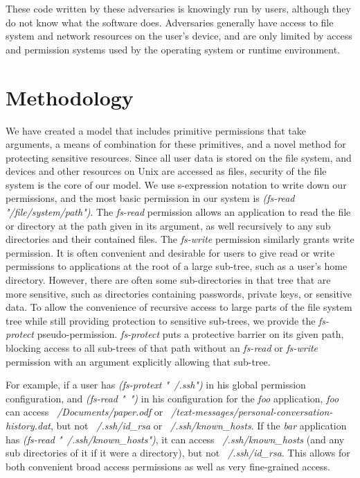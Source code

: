 These code written by these adversaries is knowingly run by users, although they do not know what the software does.  Adversaries generally have access to file system and network resources on the user's device, and are only limited by access and permission systems used by the operating system or runtime environment.

\section{Methodology}\label{section:methodology}
We have created a model that includes primitive permissions that take arguments, a means of combination for these primitives, and a novel method for protecting sensitive resources.
Since all user data is stored on the file system, and devices and other resources on Unix are accessed as files, security of the file system is the core of our model.
We use s-expression notation to write down our permissions, and the most basic permission in our system is \textit{(fs-read "/file/system/path")}.  
The \textit{fs-read} permission allows an application to read the file or directory at the path given in its argument, as well recursively to any sub directories and their contained files.
The \textit{fs-write} permission similarly grants write permission.
It is often convenient and desirable for users to give read or write permissions to applications at the root of a large sub-tree, such as a user's home directory.  
However, there are often some sub-directories in that tree that are more sensitive, such as directories containing passwords, private keys, or sensitive data.
To allow the convenience of recursive access to large parts of the file system tree while still providing protection to sensitive sub-trees, we provide the \textit{fs-protect} pseudo-permission.
\textit{fs-protect} puts a protective barrier on its given path, blocking access to all sub-trees of that path without an \textit{fs-read} or \textit{fs-write} permission with an argument explicitly allowing that sub-tree.

For example, if a user has \textit{(fs-protext "~/.ssh")} in his global permission configuration, and \textit{(fs-read "~")} in his configuration for the \textit{foo} application, \textit{foo} can access \textit{~/Documents/paper.odf} or \textit{~/text-messages/personal-conversation-history.dat}, but not \textit{~/.ssh/id\_rsa} or \textit{~/.ssh/known\_hosts}.  
If the \textit{bar} application has \textit{(fs-read "~/.ssh/known\_hosts")}, it can access \textit{~/.ssh/known\_hosts} (and any sub directories of it if it were a directory), but not \textit{~/.ssh/id\_rsa}.
This allows for both convenient broad access permissions as well as very fine-grained access.

